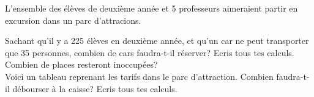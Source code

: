%
%
L'ensemble des élèves de deuxième année et 5 professeurs aimeraient partir en excursion dans un parc d'attracions.
    \begin{tasks}
        \task Sachant qu'il y a 225 élèves en deuxième année, et qu'un car ne peut transporter que 35 personnes, combien de cars faudra-t-il réserver? Ecris tous tes calculs.\\
        \task Combien de places resteront inoccupées?\\
        \task Voici un tableau reprenant les tarifs dans le parc d'attraction. Combien faudra-t-il débourser à la caisse? Ecris tous tes calculs.\\
    \end{tasks}
